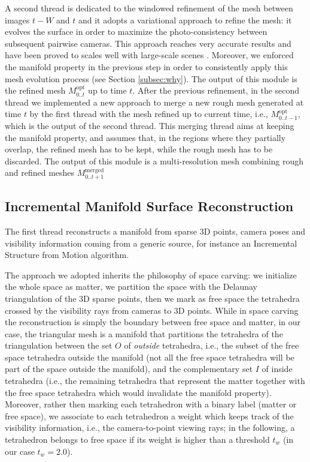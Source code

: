 A second thread is dedicated to the windowed refinement of the mesh between images $t-W$ and $t$ and it adopts a variational approach to refine the mesh: it evolves the surface in order to maximize the photo-consistency between subsequent pairwise cameras. This approach reaches very accurate results and have been proved to scales well with large-scale scenes \cite{vu2011large}.
Moreover, we enforced the manifold property in the previous step in order to  consistently apply this mesh evolution process (see Section \ref{subsec:why}). 
The output of this module is the refined mesh $\mathit{M}_{0..t}^{\text{opt}}$ up to time $t$.
After the previous refinement, in the second thread we implemented a new approach to merge a new rough mesh generated at time $t$ by the first thread with the mesh refined up to current time, i.e.,  $\mathit{M}_{0..t-1}^{\text{opt}}$, which is the output of the second thread. This merging thread aims at keeping the manifold property, and assumes that, in the regions where they partially overlap, the refined mesh has to be kept, while the rough mesh has to be discarded. 
The output of this module is a multi-resolution mesh combining rough and refined meshes $\mathit{M}_{0..t+1}^{\text{merged}}$



\subsection{Incremental Manifold Surface Reconstruction}
\label{sec:incremental_manifold}
The first thread reconstructs a manifold from sparse 3D points, camera poses and visibility information coming from a generic source, for instance an Incremental Structure from Motion algorithm. 

The approach we adopted inherits the philosophy of space carving: we initialize the whole space as matter, we partition the space with the Delaunay triangulation of the 3D sparse points, then we mark as free space the tetrahedra crossed by the visibility rays from cameras to 3D points. 
While in space carving the reconstruction is simply the boundary between free space and matter, in our case, the triangular mesh is a manifold  that partitions the tetrahedra of the triangulation between the set $O$ of \emph{outside} tetrahedra, i.e., the subset of the free space tetrahedra outside the manifold (not all the free space tetrahedra will be part of the space outside the manifold), and the complementary set $I$ of inside tetrahedra (i.e., the remaining tetrahedra that represent the matter together with the free space tetrahedra which would invalidate the manifold property). Moreover, rather then marking each tetrahedron with a binary label (matter or free space), we associate  to each tetrahedron a weight which keeps track of the visibility information, i.e., the camera-to-point viewing rays; in the following, a tetrahedron belongs to free space if its weight is higher than a threshold $t_w$ (in our case $t_w = 2.0$).



